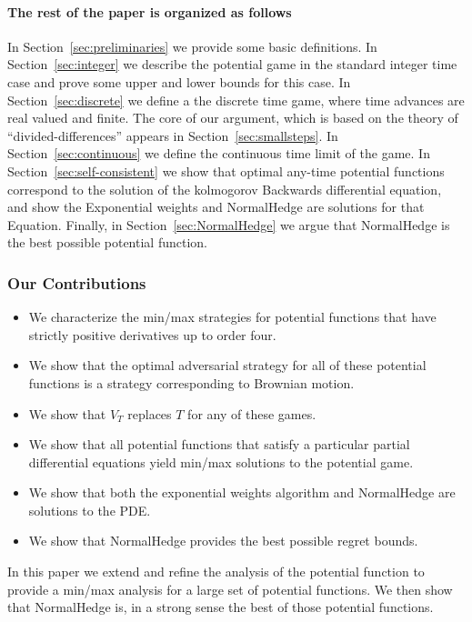 \documentclass{article}[12pt]
\begin{document}
\paragraph*{The rest of the paper is organized as follows}
In Section~\ref{sec:preliminaries} we provide some basic definitions.
In Section~\ref{sec:integer} we describe the potential game in the standard
integer time case and prove some upper and lower bounds for this
case. In Section~\ref{sec:discrete} we define a the discrete time
game, where time advances are real valued and finite. The core of our
argument, which is based on the theory of ``divided-differences''
appears in Section~\ref{sec:smallsteps}. In
Section~\ref{sec:continuous} we define the continuous time limit of
the game. In Section~\ref{sec:self-consistent} we show that optimal
any-time potential functions correspond to the solution of the
kolmogorov Backwards differential equation, and show the Exponential weights and
NormalHedge are solutions for that Equation. Finally, in
Section~\ref{sec:NormalHedge}
we argue that NormalHedge is the best possible potential function.


\iffalse
\subsubsection*{Our Contributions}
\begin{itemize}
\item We characterize the min/max strategies for 
  potential functions that have strictly positive derivatives up to
  order four.
\item We show that the optimal adversarial strategy for all of
  these potential functions is a strategy corresponding to
  Brownian motion.
\item We show that $V_T$ replaces $T$ for any of these games.
\item  We show that all potential functions that satisfy a particular
  partial differential equations yield min/max solutions to the
  potential game.
\item We show that both the exponential weights algorithm and
  NormalHedge are solutions to the PDE.
  \item We show that NormalHedge provides the best possible regret bounds.
\end{itemize}

In this paper we extend and refine the analysis of the potential
function to
provide a min/max analysis for a large set of potential functions. We
then show that NormalHedge is, in a strong sense the best of those
potential functions.
\end{document}
